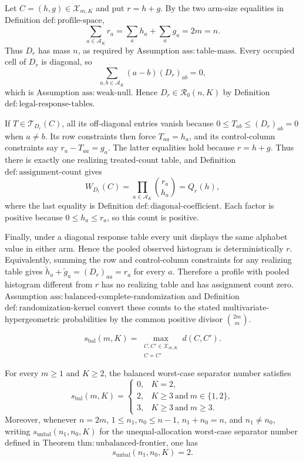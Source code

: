 Let \(C=(h,g)\in\mathcal X_{m,K}\) and put \(r=h+g\). By the two arm-size equalities in Definition \(\mathrm{def{:}profile\text{-}space}\),
\[
\sum_{a\in\mathcal A_K}r_a
=\sum_a h_a+\sum_a g_a=2m=n.
\]
Thus \(D_r\) has mass \(n\), as required by Assumption \(\mathrm{ass{:}table\text{-}mass}\). Every occupied cell of \(D_r\) is diagonal, so
\[
\sum_{a,b\in\mathcal A_K}(a-b)(D_r)_{ab}=0,
\]
which is Assumption \(\mathrm{ass{:}weak\text{-}null}\). Hence \(D_r\in\mathcal R_0(n,K)\) by Definition \(\mathrm{def{:}legal\text{-}response\text{-}tables}\).

If \(T\in\mathcal T_{D_r}(C)\), all its off-diagonal entries vanish because \(0\leq T_{ab}\leq(D_r)_{ab}=0\) when \(a\neq b\). Its row constraints then force \(T_{aa}=h_a\), and its control-column constraints say \(r_a-T_{aa}=g_a\). The latter equalities hold because \(r=h+g\). Thus there is exactly one realizing treated-count table, and Definition \(\mathrm{def{:}assignment\text{-}count}\) gives
\[
W_{D_r}(C)
=\prod_{a\in\mathcal A_K}\binom{r_a}{h_a}
=Q_r(h),
\]
where the last equality is Definition \(\mathrm{def{:}diagonal\text{-}coefficient}\). Each factor is positive because \(0\leq h_a\leq r_a\), so this count is positive.

Finally, under a diagonal response table every unit displays the same alphabet value in either arm. Hence the pooled observed histogram is deterministically \(r\). Equivalently, summing the row and control-column constraints for any realizing table gives \(\widetilde h_a+\widetilde g_a=(D_r)_{aa}=r_a\) for every \(a\). Therefore a profile with pooled histogram different from \(r\) has no realizing table and has assignment count zero. Assumption \(\mathrm{ass{:}balanced\text{-}complete\text{-}randomization}\) and Definition \(\mathrm{def{:}randomization\text{-}kernel}\) convert these counts to the stated multivariate-hypergeometric probabilities by the common positive divisor \(\binom{2m}{m}\).

\[
s_{\mathrm{bal}}(m,K)
=
\max_{\substack{C,C'\in\mathcal X_{m,K}\\ C\not\sim C'}}
d(C,C').
\]

For every \(m\geq1\) and \(K\geq2\), the balanced worst-case separator number satisfies
\[
s_{\mathrm{bal}}(m,K)=
\begin{cases}
0,&K=2,\\
2,&K\geq3\ \text{and}\ m\in\{1,2\},\\
3,&K\geq3\ \text{and}\ m\geq3.
\end{cases}
\]
Moreover, whenever \(n=2m\), \(1\leq n_1,n_0\leq n-1\), \(n_1+n_0=n\), and \(n_1\neq n_0\), writing \(s_{\mathrm{unbal}}(n_1,n_0,K)\) for the unequal-allocation worst-case separator number defined in Theorem \(\mathrm{thm{:}unbalanced\text{-}frontier}\), one has
\[
s_{\mathrm{unbal}}(n_1,n_0,K)=2.
\]

